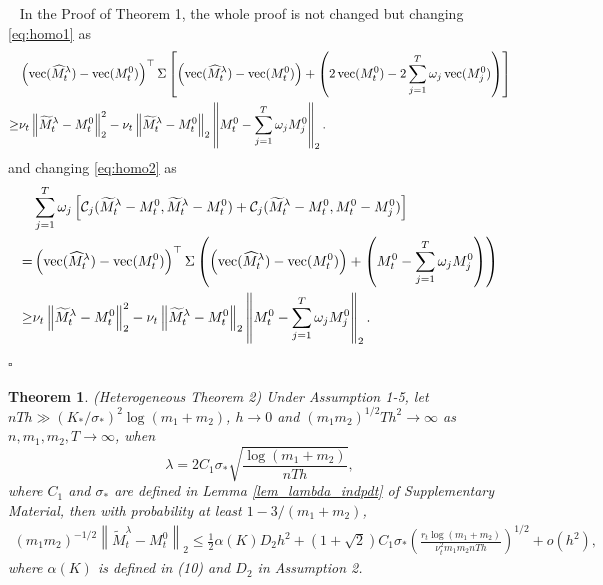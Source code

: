 \documentclass[12pt]{article}
\newcommand{\myvec}[1]%
{\stackrel{\raisebox{-2pt}[0pt][0pt]{\tiny$\rightharpoonup$}}{#1}}
\newtheorem{thm}{Theorem}
\def\myvec{\mathop{\rm vec}}
\newenvironment{pf}{{\noindent\it Proof}\ }{\hfill $\square$\par}
\begin{document}
\begin{pf}
    In the Proof of Theorem 1, the whole proof is not changed but changing \eqref{eq:homo1} as 
     \begin{equation*}
  \begin{aligned}
  & \left(\myvec({\widehat{M}}_t^\lambda) - \myvec({M}_t^0)\right)^\top \Sigma \left[ \left(\myvec({\widehat{M}}_t^\lambda)- \myvec({M}_t^0)\right) + \left(2 \myvec({M}_t^0) - 2\sum_{j=1}^T \omega_j \myvec({M}_j^0)\right)\right]\\ \ge& 
  \nu_t\left\|\widetilde{M}_t^\lambda - M_t^0\right\|_2^2 - \nu_t\left\|\widetilde{M}_t^\lambda - M_t^0\right\|_2\left\|M_t^0 - \sum_{j=1}^T \omega_j M_j^0\right\|_2.
  \end{aligned}
  \end{equation*}
    and changing \eqref{eq:homo2} as
    \begin{equation*}
  \begin{aligned}
  &\sum_{j=1}^T \omega_j\left[\mathcal{C}_j(\widetilde{M}_t^\lambda - M_t^0,\widetilde{M}_t^\lambda - M_t^0) +\mathcal{C}_j(\widetilde{M}_t^\lambda-M^0_t,M_t^0 - M_j^0)\right]
  \\=&
  \left(\myvec({\widehat{M}}_t^\lambda) - \myvec({M}_t^0)\right)^\top \Sigma \left(  \left(\myvec({\widehat{M}}_t^\lambda) - \myvec({M}_t^0)\right) + \left(M_t^0 - \sum_{j=1}^T\omega_jM_j^0\right)\right)\\\ge &
  \nu_t\left\|\widetilde{M}_t^\lambda - M_t^0\right\|_2^2 -  \nu_t\left\|\widetilde{M}_t^\lambda - M_t^0\right\|_2\left\|M_t^0 - \sum_{j=1}^T \omega_j M_j^0\right\|_2.
  \end{aligned}
  \end{equation*}
\end{pf}

  \begin{thm}\label{thm_total_hete}
  (Heterogeneous Theorem 2) 
  Under Assumption 1-5, let $n T h \gg(K_*/\sigma_*)^2 \log(m_1+m_2)$, $h\rightarrow0$ and $(m_1m_2)^{1/2}Th^2\rightarrow\infty$ as $n,m_1,m_2,T\rightarrow\infty$, when
  $$\lambda = 2C_1\sigma_*\sqrt{\frac{\log(m_1+m_2)}{n Th}}, $$
  where $C_1$ and $\sigma_*$ are defined in Lemma \ref{lem_lambda_indpdt} of Supplementary Material, then 
  with probability at least $1-3/(m_1+m_2)$,
  \begin{equation} \label{err_bound_indpdt_hete}   
  \begin{aligned}
  (m_1m_2)^{-1/2}\left\|\widetilde{M}_t^\lambda - M_t^0\right\|_2 \le \frac{1}{2}\alpha(K)D_2h^2 +\left(1+\sqrt{2}\right)C_1\sigma_*\left(\frac{r_t\log(m_1+m_2)}{\nu_t^2m_1m_2 n Th}\right)^{1/2}+o(h^2),
  \end{aligned}
  \end{equation}
  where $\alpha(K)$ is defined in (10) and $D_2$ in Assumption 2.
  \end{thm}
  
\end{document}
